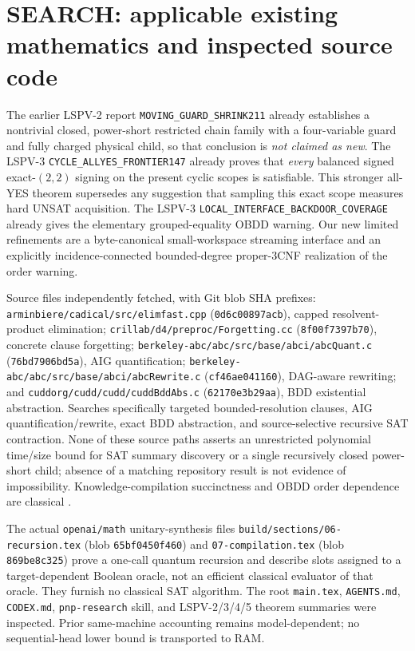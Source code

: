 \documentclass[11pt]{article}
\begin{document}
\section{SEARCH: applicable existing mathematics and inspected source code}
The earlier LSPV-2 report \texttt{MOVING\_GUARD\_SHRINK211} already establishes a nontrivial closed, power-short restricted chain family with a four-variable guard and fully charged physical child, so that conclusion is \emph{not claimed as new}. The LSPV-3 \texttt{CYCLE\_ALLYES\_FRONTIER147} already proves that \emph{every} balanced signed exact-$(2,2)$ signing on the present cyclic scopes is satisfiable. This stronger all-YES theorem supersedes any suggestion that sampling this exact scope measures hard UNSAT acquisition. The LSPV-3 \texttt{LOCAL\_INTERFACE\_BACKDOOR\_COVERAGE} already gives the elementary grouped-equality OBDD warning. Our new limited refinements are a byte-canonical small-workspace streaming interface and an explicitly incidence-connected bounded-degree proper-3CNF realization of the order warning.

Source files independently fetched, with Git blob SHA prefixes: \texttt{arminbiere/cadical/src/elimfast.cpp} (\texttt{0d6c00897acb}), capped resolvent-product elimination; \texttt{crillab/d4/preproc/Forgetting.cc} (\texttt{8f00f7397b70}), concrete clause forgetting; \texttt{berkeley-abc/abc/src/base/abci/abcQuant.c} (\texttt{76bd7906bd5a}), AIG quantification; \texttt{berkeley-abc/abc/src/base/abci/abcRewrite.c} (\texttt{cf46ae041160}), DAG-aware rewriting; and \texttt{cuddorg/cudd/cudd/cuddBddAbs.c} (\texttt{62170e3b29aa}), BDD existential abstraction. Searches specifically targeted bounded-resolution clauses, AIG quantification/rewrite, exact BDD abstraction, and source-selective recursive SAT contraction. None of these source paths asserts an unrestricted polynomial time/size bound for SAT summary discovery or a single recursively closed power-short child; absence of a matching repository result is not evidence of impossibility. Knowledge-compilation succinctness and OBDD order dependence are classical \cite{bryant,dm,amarilli}.

The actual \texttt{openai/math} unitary-synthesis files \texttt{build/sections/06-recursion.tex} (blob \texttt{65bf0450f460}) and \texttt{07-compilation.tex} (blob \texttt{869be8c325}) prove a one-call quantum recursion and describe slots assigned to a target-dependent Boolean oracle, not an efficient classical evaluator of that oracle. They furnish no classical SAT algorithm. The root \texttt{main.tex}, \texttt{AGENTS.md}, \texttt{CODEX.md}, \texttt{pnp-research} skill, and LSPV-2/3/4/5 theorem summaries were inspected. Prior same-machine accounting remains model-dependent; no sequential-head lower bound is transported to RAM.
\end{document}
